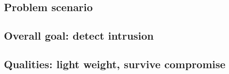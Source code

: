 
\subsection{Problem scenario}
\subsection{Overall goal: detect intrusion}
\subsection{Qualities: light weight, survive compromise}
